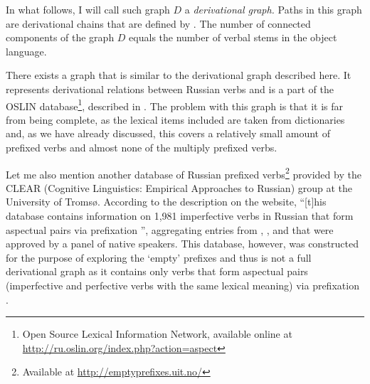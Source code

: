 In what follows, I will call such graph $D$ a \textit{derivational graph.} Paths in this graph are derivational chains that are defined by . The number of connected components of the graph $D$ equals the number of verbal stems in the object language.

There exists a graph that is similar to the derivational graph described here. It represents derivational relations between Russian verbs and is a part of the OSLIN database\footnote{Open Source Lexical Information Network, available online at \url{http://ru.oslin.org/index.php?action=aspect}}, described in \cite{Borik:12}. The problem with this graph is that it is far from being complete, as the lexical items included are taken from dictionaries and, as we have already discussed, this covers a relatively small amount of prefixed verbs and almost none of the multiply prefixed verbs.

Let me also mention another database of Russian prefixed verbs\footnote{Available at \url{http://emptyprefixes.uit.no/}} provided by the CLEAR (Cognitive Linguistics: Empirical Approaches to Russian) group at the University of Troms{\o}. According to the description on the website, ``[t]his database contains information on 1,981 imperfective verbs  in Russian that form aspectual pairs  via prefixation '', aggregating entries from \citet{MAS}, \citet{Ozegov:01},  and \citet{Cubberly:82} that were approved by a panel of native speakers. This database, however, was constructed for the purpose of exploring the `empty' prefixes and thus is not a full derivational graph as it contains only verbs that form aspectual pairs  (imperfective and perfective verbs  with the same lexical meaning) via prefixation .

